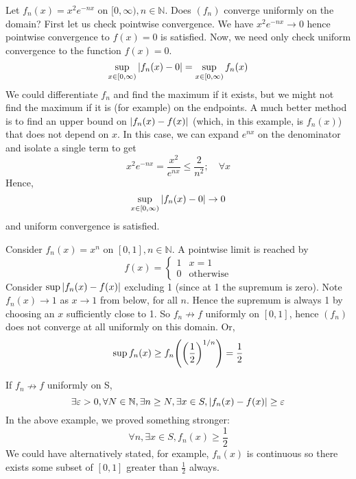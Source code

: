 \begin{example}
	Let \( f_n(x) = x^2 e^{-nx} \) on \( [0, \infty), n \in \mathbb N \).
	Does \( (f_n) \) converge uniformly on the domain?
	First let us check pointwise convergence.
	We have \( x^2 e^{-nx} \to 0 \) hence pointwise convergence to \( f(x) = 0 \) is satisfied.
	Now, we need only check uniform convergence to the function \( f(x) = 0 \).
	\[
		\sup_{x \in [0, \infty)} \abs{f_n(x) - 0} = \sup_{x \in [0, \infty)} f_n(x)
	\]
	We could differentiate \( f_n \) and find the maximum if it exists, but we might not find the maximum if it is (for example) on the endpoints.
	A much better method is to find an upper bound on \( \abs{f_n(x)-f(x)} \) (which, in this example, is \( f_n(x) \)) that does not depend on \( x \).
	In this case, we can expand \( e^{nx} \) on the denominator and isolate a single term to get
	\[
		x^2 e^{-nx} = \frac{x^2}{e^{nx}} \leq \frac{2}{n^2};\quad \forall x
	\]
	Hence,
	\[
		\sup_{x \in [0, \infty)} \abs{f_n(x) - 0} \to 0
	\]
	and uniform convergence is satisfied.
\end{example}
\begin{example}
	Consider \( f_n(x) = x^n \) on \( [0,1], n \in \mathbb N \).
	A pointwise limit is reached by
	\[
		f(x) = \begin{cases}
			1 & x = 1            \\
			0 & \text{otherwise}
		\end{cases}
	\]
	Consider \( \sup \abs{f_n(x) - f(x)} \) excluding 1 (since at 1 the supremum is zero).
	Note \( f_n(x) \to 1 \) as \( x \to 1 \) from below, for all \( n \).
	Hence the supremum is always 1 by choosing an \( x \) sufficiently close to 1.
	So \( f_n \nrightarrow f \) uniformly on \( [0,1] \), hence \( (f_n) \) does not converge at all uniformly on this domain.
	Or,
	\[
		\sup f_n(x) \geq f_n\qty(\qty(\frac{1}{2})^{1/n}) = \frac{1}{2}
	\]
\end{example}

\begin{remark}
	If \(f_n \nrightarrow f\) uniformly on S,
	\[
		\exists \varepsilon > 0, \forall N \in \mathbb N, \exists n \geq N, \exists x \in S, \abs{f_n(x) - f(x)} \geq \varepsilon
	\]
	In the above example, we proved something stronger:
	\[
		\forall n, \exists x \in S, f_n(x) \geq \frac{1}{2}
	\]
	We could have alternatively stated, for example, \( f_n(x) \) is continuous so there exists some subset of \( [0, 1] \) greater than \( \frac{1}{2} \) always.
\end{remark}

